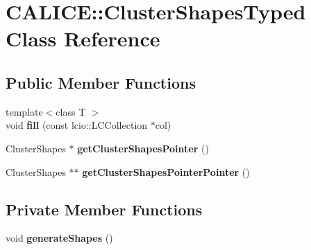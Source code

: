 \section{CALICE::ClusterShapesTyped Class Reference}
\label{classCALICE_1_1ClusterShapesTyped}
\subsection*{Public Member Functions}
\begin{DoxyCompactItemize}
\item 
{\footnotesize template$<$class T $>$ }\\void {\bfseries fill} (const lcio::LCCollection $\ast$col)\label{classCALICE_1_1ClusterShapesTyped_afb62e9b658c7420051df7d997aa02800}

\item 
ClusterShapes $\ast$ {\bfseries getClusterShapesPointer} ()\label{classCALICE_1_1ClusterShapesTyped_a856df7a286fb0facfd9a87ae11286ec9}

\item 
ClusterShapes $\ast$$\ast$ {\bfseries getClusterShapesPointerPointer} ()\label{classCALICE_1_1ClusterShapesTyped_a9d3fabcc3aebb217c7c5673c077bb4ea}

\end{DoxyCompactItemize}
\subsection*{Private Member Functions}
\begin{DoxyCompactItemize}
\item 
void {\bfseries generateShapes} ()\label{classCALICE_1_1ClusterShapesTyped_a0526e8ad7d133ee4b3fee30d13f72d66}

\end{DoxyCompactItemize}
